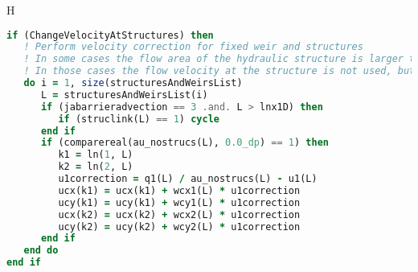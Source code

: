 
\gls{H}


\begin{lstlisting}[language=fortran, caption={original code for correcting velocity},label={lst:code_1}]
if (ChangeVelocityAtStructures) then
   ! Perform velocity correction for fixed weir and structures
   ! In some cases the flow area of the hydraulic structure is larger than the flow area of the branch.
   ! In those cases the flow velocity at the structure is not used, but the upstream velocity
   do i = 1, size(structuresAndWeirsList)
      L = structuresAndWeirsList(i)
      if (jabarrieradvection == 3 .and. L > lnx1D) then
         if (struclink(L) == 1) cycle
      end if
      if (comparereal(au_nostrucs(L), 0.0_dp) == 1) then
         k1 = ln(1, L)
         k2 = ln(2, L)
         u1correction = q1(L) / au_nostrucs(L) - u1(L)
         ucx(k1) = ucx(k1) + wcx1(L) * u1correction
         ucy(k1) = ucy(k1) + wcy1(L) * u1correction
         ucx(k2) = ucx(k2) + wcx2(L) * u1correction
         ucy(k2) = ucy(k2) + wcy2(L) * u1correction
      end if
   end do
end if
\end{lstlisting}